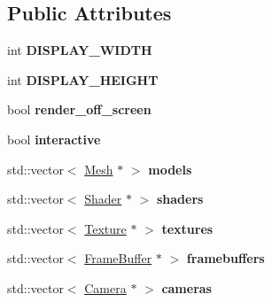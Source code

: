 \subsection*{Public Attributes}
\begin{DoxyCompactItemize}
\item 
\hypertarget{classRenderEngine_a5c37ad7f00e36e4e645ad230572a1653}{int {\bfseries D\-I\-S\-P\-L\-A\-Y\-\_\-\-W\-I\-D\-T\-H}}\label{classRenderEngine_a5c37ad7f00e36e4e645ad230572a1653}

\item 
\hypertarget{classRenderEngine_a35611b5ed99acc5bc8153ede2c0c1482}{int {\bfseries D\-I\-S\-P\-L\-A\-Y\-\_\-\-H\-E\-I\-G\-H\-T}}\label{classRenderEngine_a35611b5ed99acc5bc8153ede2c0c1482}

\item 
\hypertarget{classRenderEngine_a92ab578a812c30aacc3523fd6a4601ea}{bool {\bfseries render\-\_\-off\-\_\-screen}}\label{classRenderEngine_a92ab578a812c30aacc3523fd6a4601ea}

\item 
\hypertarget{classRenderEngine_a979d792732177be3dae75e056785c57e}{bool {\bfseries interactive}}\label{classRenderEngine_a979d792732177be3dae75e056785c57e}

\item 
\hypertarget{classRenderEngine_a7a47ae6dd660d96a20d9f60b26f11587}{std\-::vector$<$ \hyperlink{classMesh}{Mesh} $\ast$ $>$ {\bfseries models}}\label{classRenderEngine_a7a47ae6dd660d96a20d9f60b26f11587}

\item 
\hypertarget{classRenderEngine_a9d6728b7488ed948beab7d866413b350}{std\-::vector$<$ \hyperlink{classShader}{Shader} $\ast$ $>$ {\bfseries shaders}}\label{classRenderEngine_a9d6728b7488ed948beab7d866413b350}

\item 
\hypertarget{classRenderEngine_abe63aeca31676193c19aad15cd9c7314}{std\-::vector$<$ \hyperlink{classTexture}{Texture} $\ast$ $>$ {\bfseries textures}}\label{classRenderEngine_abe63aeca31676193c19aad15cd9c7314}

\item 
\hypertarget{classRenderEngine_a4a3ea49a2497b956234c73c42d4ba429}{std\-::vector$<$ \hyperlink{classFrameBuffer}{Frame\-Buffer} $\ast$ $>$ {\bfseries framebuffers}}\label{classRenderEngine_a4a3ea49a2497b956234c73c42d4ba429}

\item 
\hypertarget{classRenderEngine_afa597de90b2c5a596928e3b5ed1bb8e1}{std\-::vector$<$ \hyperlink{classCamera}{Camera} $\ast$ $>$ {\bfseries cameras}}\label{classRenderEngine_afa597de90b2c5a596928e3b5ed1bb8e1}


\end{DoxyCompactItemize}
